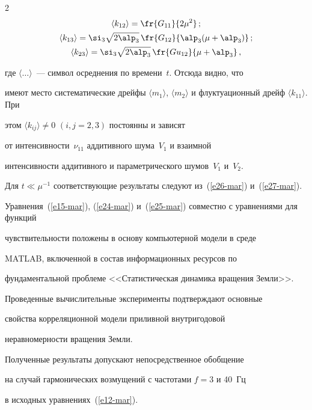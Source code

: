 \begin{multicols}{2}
\begin{gather*}
    \langle k_{12} \rangle = \fr{G_{11}}{ 2\mu^2} \,;\\


\langle k_{13} \rangle = \si_3\sqrt{2\alp_3}\,\fr{G_{12}}{ \alp_3(\mu +\alp_3)}\,;\\


 \langle k_{23} \rangle = \si_3\sqrt{2\alp_3}\,\fr{Gu_{12}}{\mu +\alp_3}\,, %


\end{gather*}


где $\langle\ldots\rangle$~--- символ осреднения по времени~$t$. Отсюда видно, что


имеют место сис\-те\-матические дрейфы $\langle m_1 \rangle$, $\langle


m_2 \rangle$ и флуктуационный дрейф $\langle k_{11} \rangle$. При


этом $\langle k_{ij} \rangle\ne 0$ $(i,j=2,3)$ постоянны и зависят


от интенсивности~$\nu_{11}$ аддитивного шума~$V_1$ и взаимной


интенсивности аддитивного и параметрического шумов~$V_1$ и~$V_2$.


Для  $t\ll \mu^{-1}$ соответствующие результаты следуют из~(\ref{e26-mar}) и~(\ref{e27-mar}).





Уравнения~(\ref{e15-mar}), (\ref{e24-mar}) и~(\ref{e25-mar}) совместно с уравнениями для функций


чувствительности положены в основу компьютерной модели в среде


MATLAB, включенной в состав информационных ресурсов по


фундаментальной проблеме <<Статистическая динамика вращения Земли>>.


Проведенные вы\-чис\-ли\-тель\-ные эксперименты подтверждают основные


свойства корреляционной модели приливной внут\-ри\-го\-до\-вой


неравномерности вращения Земли.





Полученные результаты допускают непосредственное обобщение 


на случай гармонических возмущений с частотами $f=3$ и 40~Гц 


в исходных уравнениях~(\ref{e12-mar}).






\end{multicols}
